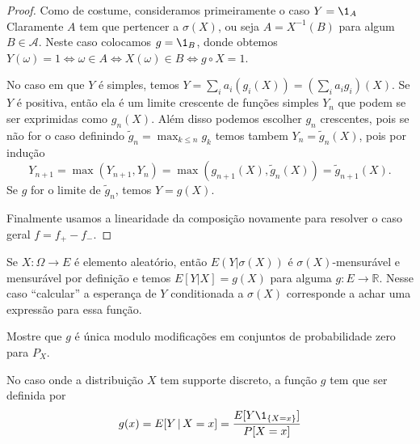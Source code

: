 \begin{proof}
  Como de costume, consideramos primeiramente o caso $Y = \1_A$
  Claramente $A$ tem que pertencer a $\sigma(X)$, ou seja $A = X^{-1}(B)$ para algum $B \in \mathcal{A}$.
  Neste caso colocamos $g = \1_B$, donde obtemos $Y(\omega) = 1 \Leftrightarrow \omega \in A \Leftrightarrow X(\omega) \in B \Leftrightarrow g \circ X = 1$.

  No caso em que $Y$ é simples, temos $Y = \sum_i a_i (g_i (X)) = (\sum_i a_i g_i)(X)$.
  Se $Y$ é positiva, então ela é um limite crescente de funções simples $Y_n$ que podem se ser exprimidas como $g_n(X)$. 
  Além disso podemos escolher $g_n$ crescentes, pois se não for o caso definindo $\tilde g_n= \max_{k\le n}g_k$ temos
  tambem $Y_n=\tilde g_n(X)$, pois por indução
  \begin{equation}
    Y_{n+1} = \max(Y_{n+1}, Y_{n}) = \max(g_{n+1}(X) , \tilde g_n(X)) = \tilde g_{n+1}(X).
  \end{equation}
Se $g$ for o limite de $\tilde g_n$, temos $Y=g(X)$.

\medskip

  Finalmente usamos a linearidade da composição novamente para resolver o caso geral $f = f_+ - f_-$.
\end{proof}







Se $X: \Omega \to E$ é elemento aleatório, então $E(Y|\sigma(X))$ é $\sigma(X)$-mensurável e mensurável por definição e temos
$E[Y| X] = g(X)$ para alguma $g: E \to \mathbb{R}$.
Nesse caso ``calcular'' a esperança de $Y$ conditionada a $\sigma(X)$ corresponde a achar uma expressão para essa função. 

\begin{exercise}
  Mostre que $g$ é única modulo modificações em conjuntos de probabilidade zero para $P_X$. 
\end{exercise}

No caso onde a distribuição $X$ tem supporte discreto, a função $g$ tem que ser definida por 
$$g(x)=E[Y \, | \, X = x]= \frac{E[Y\1_{\{X=x\}}]}{P[X=x]}$$


% 

